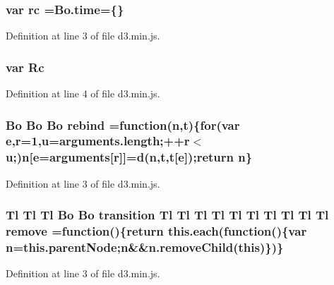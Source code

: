 \subsubsection[{rc}]{\setlength{\rightskip}{0pt plus 5cm}var rc =Bo.\+time=\{\}}\label{d3_8min_8js_a01911beba42618bf63ba97d43eafd2fb}


Definition at line 3 of file d3.\+min.\+js.

\subsubsection[{Rc}]{\setlength{\rightskip}{0pt plus 5cm}var Rc}\label{d3_8min_8js_aa038845c524d47d77c9529c0f35978c8}


Definition at line 4 of file d3.\+min.\+js.

\subsubsection[{rebind}]{ {\bf Bo} {\bf Bo} {\bf Bo} rebind =function({\bf n},t)\{{\bf for}(var {\bf e},{\bf r}=1,u=arguments.\+length;++{\bf r}$<$u;){\bf n}[{\bf e}=arguments[{\bf r}]]={\bf d}({\bf n},t,t[{\bf e}]);{\bf return} {\bf n}\}}\label{d3_8min_8js_aec5718bb3966f8082fd7edfb77080946}


Definition at line 3 of file d3.\+min.\+js.

\subsubsection[{remove}]{ {\bf Tl} {\bf Tl} {\bf Tl} {\bf Bo} {\bf Bo} {\bf transition} {\bf Tl} {\bf Tl} {\bf Tl} {\bf Tl} {\bf Tl} {\bf Tl} {\bf Tl} {\bf Tl} {\bf Tl} {\bf Tl} remove =function()\{{\bf return} {\bf this.\+each}(function()\{var {\bf n}=this.\+parent\+Node;{\bf n}\&\&n.\+remove\+Child({\bf this})\})\}}\label{d3_8min_8js_aa7629e99319f4644b262e247ea749d37}


Definition at line 3 of file d3.\+min.\+js.

